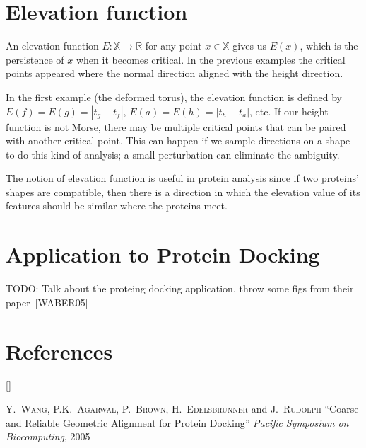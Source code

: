 \documentclass{article}
\renewcommand{\cite}[1]{[#1]}
\def\beginrefs{\begin{list}%
        {[\arabic{equation}]}{\usecounter{equation}
         \setlength{\leftmargin}{2.0truecm}\setlength{\labelsep}{0.4truecm}%
         \setlength{\labelwidth}{1.6truecm}}}
\def\endrefs{\end{list}}
\def\bibentry#1{\item[\hbox{[#1]}]}
\begin{document}
\section{Elevation function}

An elevation function $E:\mathbb{X}\to\mathbb{R}$ for any point $x\in\mathbb{X}$ gives us $E(x)$, which is the persistence of $x$ when it becomes critical. In the previous examples the critical points appeared where the normal direction aligned with the height direction.

In the first example (the deformed torus), the elevation function is defined by $E(f)=E(g)=|t_g-t_f|$, $E(a)=E(h)=|t_h-t_a|$, etc. If our height function is not Morse, there may be multiple critical points that can be paired with another critical point. This can happen if we sample directions on a shape to do this kind of analysis; a small perturbation can eliminate the ambiguity.

The notion of elevation function is useful in protein analysis since if two proteins' shapes are compatible, then there is a direction in which the elevation value of its features should be similar where the proteins meet.

\section{Application to Protein Docking}

TODO: Talk about the proteing docking application, throw some figs from their paper~\cite{WABER05}

\section*{References}
\beginrefs

\bibentry{WABER05}\textsc{Y.~Wang}, \textsc{P.K.~Agarwal}, \textsc{P.~Brown},
\textsc{H.~Edelsbrunner} and \textsc{J.~Rudolph}
``Coarse and Reliable Geometric Alignment for Protein Docking''
\textit{Pacific Symposium on Biocomputing},
2005

\endrefs
\end{document}
